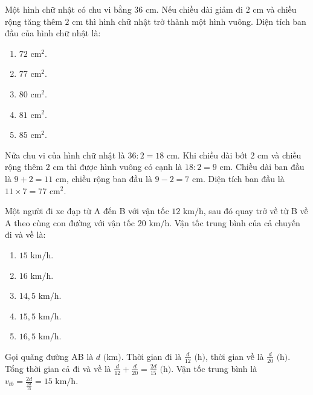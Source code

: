 \begin{baitap}
Một hình chữ nhật có chu vi bằng $36\text{ cm}$. Nếu chiều dài giảm đi $2\text{ cm}$ và chiều rộng tăng thêm $2\text{ cm}$ thì hình chữ nhật trở thành một hình vuông. Diện tích ban đầu của hình chữ nhật là:
\begin{enumerate}
	\item $72\text{ cm}^2$.
	\item $77\text{ cm}^2$.
	\item $80\text{ cm}^2$.
	\item $81\text{ cm}^2$.
	\item $85\text{ cm}^2$.
\end{enumerate}
\begin{traloi}
	Nửa chu vi của hình chữ nhật là $36 : 2 = 18\text{ cm}$. Khi chiều dài bớt $2\text{ cm}$ và chiều rộng thêm $2\text{ cm}$ thì được hình vuông có cạnh là $18 : 2 = 9\text{ cm}$. Chiều dài ban đầu là $9 + 2 = 11\text{ cm}$, chiều rộng ban đầu là $9 - 2 = 7\text{ cm}$. Diện tích ban đầu là $11 \times 7 = 77\text{ cm}^2$.
\end{traloi}
\end{baitap}

\begin{baitap}
Một người đi xe đạp từ A đến B với vận tốc $12\text{ km/h}$, sau đó quay trở về từ B về A theo cùng con đường với vận tốc $20\text{ km/h}$. Vận tốc trung bình của cả chuyến đi và về là:
\begin{enumerate}
	\item $15\text{ km/h}$.
	\item $16\text{ km/h}$.
	\item $14{,}5\text{ km/h}$.
	\item $15{,}5\text{ km/h}$.
	\item $16{,}5\text{ km/h}$.
\end{enumerate}
\begin{traloi}
	Gọi quãng đường AB là $d\text{ (km)}$. Thời gian đi là $\frac{d}{12}\text{ (h)}$, thời gian về là $\frac{d}{20}\text{ (h)}$. Tổng thời gian cả đi và về là $\frac{d}{12} + \frac{d}{20} = \frac{2d}{15}\text{ (h)}$. Vận tốc trung bình là $v_{tb} = \frac{2d}{\frac{2d}{15}} = 15\text{ km/h}$.
\end{traloi}
\end{baitap}

